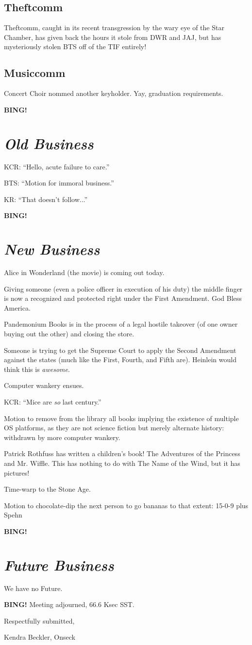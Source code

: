 \documentclass[10pt]{article}
\newcommand{\bing}{{\bf BING!} }
\newcommand{\goto}[1]{\bing \vskip 12pt \section*{{\em{#1}}}}
\newcommand{\ps}{ plus Spehn\xspace}
\newcommand{\onseck}{Kendra Beckler, Onseck}
\begin{document}
\subsection*{Theftcomm}

Theftcomm, caught in its recent transgression by the wary eye of the Star Chamber, has given back the hours it stole from DWR and JAJ, but has mysteriously stolen BTS off of the TIF entirely!

\subsection*{Musiccomm}

Concert Choir nommed another keyholder.  Yay, graduation requirements.

\goto{Old Business}

KCR: ``Hello, acute failure to care.''

BTS: ``Motion for immoral business.''

KR: ``That doesn't follow...''

\goto{New Business}

Alice in Wonderland (the movie) is coming out today.

Giving someone (even a police officer in execution of his duty) the middle finger is now a recognized and protected right under the First Amendment.  God Bless America.

Pandemonium Books is in the process of a legal hostile takeover (of one owner buying out the other) and closing the store.

Someone is trying to get the Supreme Court to apply the Second Amendment against the states (much like the First, Fourth, and Fifth are).  Heinlein would think this is \textit{awesome}.

Computer wankery ensues.

KCR: ``Mice are \textit{so} last century.''

Motion to remove from the library all books implying the existence of multiple OS platforms, as they are not science fiction but merely alternate history: withdrawn by more computer wankery.

Patrick Rothfuss has written a children's book!  The Adventures of the Princess and Mr. Wiffle.  This has nothing to do with The Name of the Wind, but it has pictures!

Time-warp to the Stone Age.

Motion to chocolate-dip the next person to go bananas to that extent: 15-0-9 \ps

\goto{Future Business}

We have no Future.

\bing
\noindent
Meeting adjourned, 66.6 Ksec SST.

\vspace{18pt}

\centerline{Respectfully submitted,}
\centerline{\onseck}
\end{document}
